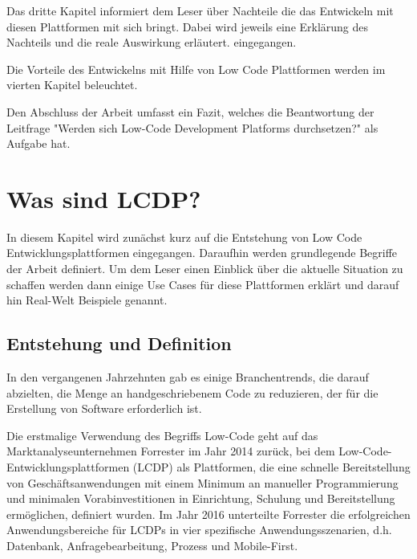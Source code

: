 \documentclass[12pt]{article} %
\begin{document}
	Das dritte Kapitel informiert dem Leser über Nachteile die das Entwickeln mit diesen Plattformen mit sich bringt. Dabei wird jeweils eine Erklärung des Nachteils und die reale Auswirkung erläutert. %
	eingegangen. 
	
	Die Vorteile des Entwickelns mit Hilfe von Low Code Plattformen werden im vierten Kapitel beleuchtet. 
	
	
	Den Abschluss der Arbeit umfasst ein Fazit, welches die Beantwortung der Leitfrage "Werden sich Low-Code Development Platforms durchsetzen?" als Aufgabe hat. 
	
	\section{Was sind LCDP?}
	In diesem Kapitel wird zunächst kurz auf die Entstehung von Low Code Entwicklungsplattformen eingegangen. Daraufhin werden grundlegende Begriffe der Arbeit definiert. Um dem Leser einen Einblick über die aktuelle Situation zu schaffen werden dann einige Use Cases für diese Plattformen erklärt und darauf hin Real-Welt Beispiele genannt. 
	
	\subsection{Entstehung und Definition}		
	In den vergangenen Jahrzehnten gab es einige Branchentrends, die darauf abzielten, die Menge an handgeschriebenem Code zu reduzieren, der für die Erstellung von Software erforderlich ist. \cite{DiRuscio.2022}\newline
	
	Die erstmalige Verwendung des Begriffs Low-Code geht auf das Marktanalyseunternehmen Forrester im Jahr 2014 zurück, bei dem Low-Code-Entwicklungsplattformen (LCDP) als Plattformen, die eine schnelle Bereitstellung von Geschäftsanwendungen mit einem Minimum an manueller Programmierung und minimalen Vorabinvestitionen in Einrichtung, Schulung und Bereitstellung ermöglichen, definiert wurden. 
	Im Jahr 2016 unterteilte Forrester die erfolgreichen Anwendungsbereiche für LCDPs in vier spezifische Anwendungsszenarien, d.h. Datenbank, Anfragebearbeitung, Prozess und Mobile-First. \cite{DiRuscio.2022}\newline %
	
\end{document}
